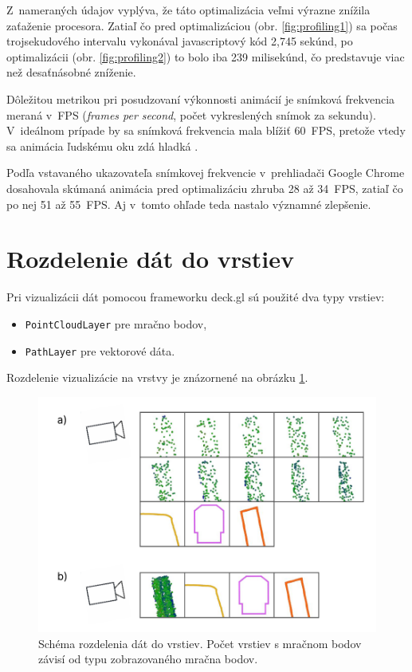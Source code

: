 Z~nameraných údajov vyplýva, že táto optimalizácia veľmi výrazne znížila zaťaženie procesora. Zatiaľ čo pred optimalizáciou (obr. \ref{fig:profiling1}) sa počas trojsekudového intervalu vykonával javascriptový kód 2,745 sekúnd, po optimalizácii (obr. \ref{fig:profiling2}) to bolo iba 239 milisekúnd, čo predstavuje viac než desaťnásobné zníženie.

Dôležitou metrikou pri posudzovaní výkonnosti animácií je snímková frekvencia meraná v~FPS (\emph{frames per second}, počet vykreslených snímok za sekundu). V~ideálnom prípade by sa snímková frekvencia mala blížiť 60~FPS, pretože vtedy sa animácia ľudskému oku zdá hladká \cite{chrome_profiling}.

Podľa vstavaného ukazovateľa snímkovej frekvencie v~prehliadači Google Chrome dosahovala skúmaná animácia pred optimalizáciu zhruba 28 až 34~FPS, zatiaľ čo po nej 51 až 55~FPS. Aj v~tomto ohľade teda nastalo významné zlepšenie.

\section{Rozdelenie dát do vrstiev}

Pri vizualizácii dát pomocou frameworku deck.gl sú použité dva typy vrstiev:
\begin{itemize}
    \item \texttt{PointCloudLayer} pre mračno bodov,
    \item \texttt{PathLayer} pre vektorové dáta.
\end{itemize}
Rozdelenie vizualizácie na vrstvy je znázornené na obrázku \ref{fig:vrstvy}.

\begin{figure}[h]
    \centering
    \includegraphics[width=0.8\linewidth]{text_prace/obrazky-figures/vrstvy.pdf}
    \caption{Schéma rozdelenia dát do vrstiev. Počet vrstiev s mračnom bodov závisí od typu zobrazovaného mračna bodov.}
    \label{fig:vrstvy}
\end{figure}

